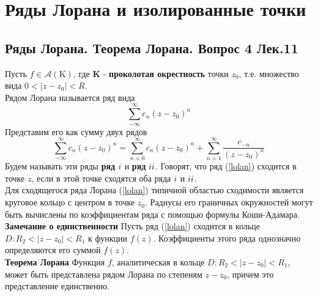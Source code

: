 \documentclass{article}
\begin{document}
\section{Ряды Лорана и изолированные точки}
\subsection{Ряды Лорана. Теорема Лорана. Вопрос 4 Лек.11}
	Пусть $f \in \mathcal{A}(\mathrm{K})$, где $\mathbf{K}$ - \textbf{проколотая окрестность} точки $ z_{0}$, т.е. множество вида $ 0<\left|z-z_{0}\right|<R $.\\
	Рядом Лорана называется ряд вида
	\begin{equation}
	\label{lolan}
	\sum_{-\infty}^{\infty}{c}_{n}{(z-{z}_{0})}^{n}
	\end{equation}
	Представим его как сумму двух рядов
	\begin{equation}
	\sum_{-\infty}^{\infty}{c}_{n}{(z-{z}_{0})}^{n}=\sum_{n=0}^{\infty}{c}_{n}{(z-{z}_{0})}^{n}+\sum_{n=1}^{\infty} \frac{{c}_{-n}}{{(z-{z}_{0})}^{n}}
	\end{equation}
	Будем называть эти ряды \textbf{ряд} $\uppercase\expandafter{\romannumeral1}$ и \textbf{ряд} $\uppercase\expandafter{\romannumeral2}$. Говорят, что ряд (\ref{lolan}) сходится в точке $ z$, если в этой точке сходятся оба ряда $\uppercase\expandafter{\romannumeral1}$ и $\uppercase\expandafter{\romannumeral2}$.\\
	Для сходящегося ряда Лорана (\ref{lolan}) типичной областью сходимости является круговое кольцо с центром в точке ${z}_{0}$. Радиусы его граничных окружностей могут быть вычислены по коэффициентам ряда с помощью формулы Коши-Адамара.\\
	\textbf{Замечание о единственности} Пусть ряд (\ref{lolan}) сходится в кольце $D:{R}_{2}<|z-{z}_{0}|<{R}_{1}$ к функции $f(z)$. 
	Коэффициенты этого ряда однозначно определяются его суммой $f(z)$.\\
	\textbf{Теорема Лорана} Функция $ f$, аналитическая в кольце $ D: R_{2}<\left|z-z_{0}\right|<R_{1}$, может быть представлена рядом Лорана по степеням $ z-z_{0}$, причем это представление
	единственно.\\
\end{document}

